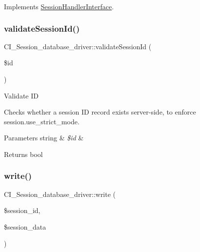 Implements \mbox{\hyperlink{interface_session_handler_interface}{Session\+Handler\+Interface}}.

\mbox{\label{class_c_i___session__database__driver_ab810ace1dcf710cd32ca3e5006499340}} 
\subsubsection{\texorpdfstring{validate\+Session\+Id()}{validateSessionId()}}
{\footnotesize\ttfamily C\+I\+\_\+\+Session\+\_\+database\+\_\+driver\+::validate\+Session\+Id (\begin{DoxyParamCaption}\item[{}]{\$id }\end{DoxyParamCaption})}

Validate ID

Checks whether a session ID record exists server-\/side, to enforce session.\+use\+\_\+strict\+\_\+mode.


\begin{DoxyParams}[1]{Parameters}
string & {\em \$id} & \\
\hline
\end{DoxyParams}
\begin{DoxyReturn}{Returns}
bool 
\end{DoxyReturn}
\mbox{\label{class_c_i___session__database__driver_a9d04ba75ca5700ae3e44b156d2df1447}} 
\subsubsection{\texorpdfstring{write()}{write()}}
{\footnotesize\ttfamily C\+I\+\_\+\+Session\+\_\+database\+\_\+driver\+::write (\begin{DoxyParamCaption}\item[{}]{\$session\+\_\+id,  }\item[{}]{\$session\+\_\+data }\end{DoxyParamCaption})}

